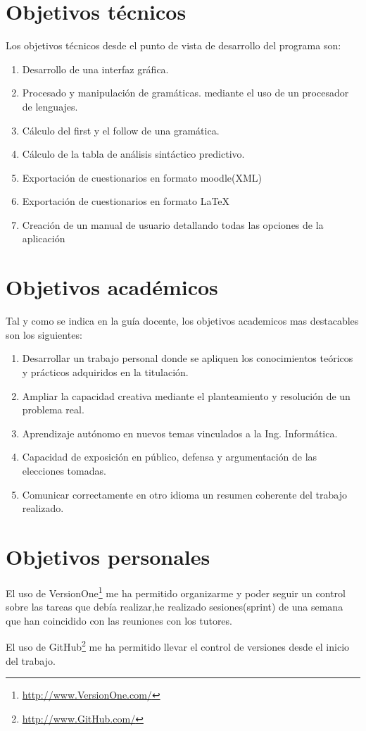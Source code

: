 
\section{Objetivos técnicos}

Los objetivos técnicos desde el punto de vista de desarrollo del programa son:
\begin{enumerate}
	\item Desarrollo de una interfaz gráfica.
	\item Procesado y manipulación de gramáticas. mediante el uso de un procesador de lenguajes.
	\item Cálculo del first y el follow de una gramática.
	\item Cálculo de la tabla de análisis sintáctico predictivo.
	\item Exportación de cuestionarios en formato moodle(XML)
	\item Exportación de cuestionarios en formato LaTeX
	\item Creación de un manual de usuario detallando todas las opciones de la aplicación
\end{enumerate}

\section{Objetivos académicos}
Tal y como se indica en la guía docente, los objetivos academicos mas destacables son los siguientes:
\begin{enumerate}
	
	\item Desarrollar un trabajo personal donde se 	apliquen los conocimientos teóricos y prácticos adquiridos en la titulación.
	\item Ampliar la capacidad creativa mediante el planteamiento y resolución de un problema real.
	\item Aprendizaje autónomo en nuevos temas vinculados a la Ing. Informática.
	\item Capacidad de exposición en público, defensa y argumentación de las elecciones tomadas.
	\item Comunicar correctamente en otro idioma un resumen coherente del trabajo realizado.

\end{enumerate}

\section{Objetivos personales}


El uso de VersionOne\footnote{\url{http://www.VersionOne.com/}} me ha permitido organizarme y poder seguir un control sobre las tareas que debía realizar,he realizado sesiones(sprint) de una semana que han coincidido con las reuniones con los tutores.

El uso de GitHub\footnote{\url{http://www.GitHub.com/}} me ha permitido llevar el control de versiones desde el inicio del trabajo.

